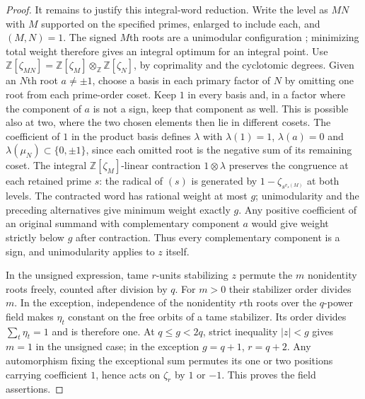 \documentclass[11pt,a4paper]{article}
\numberwithin{equation}{section}
\theoremstyle{remark}
\begin{document}
\begin{proof}
It remains to justify this integral-word reduction. Write the level as $MN$ with $M$ supported on the specified primes, enlarged to include each, and $(M,N)=1$. The signed $M$th roots are a unimodular configuration \cite[Theorems~3, 13]{BH}; minimizing total weight therefore gives an integral optimum for an integral point. Use $\mathbb Z[\zeta_{MN}]=\mathbb Z[\zeta_M]\otimes_{\mathbb Z}\mathbb Z[\zeta_N]$, by coprimality and the cyclotomic degrees. Given an $N$th root $a\ne\pm1$, choose a basis in each primary factor of $N$ by omitting one root from each prime-order coset. Keep $1$ in every basis and, in a factor where the component of $a$ is not a sign, keep that component as well. This is possible also at two, where the two chosen elements then lie in different cosets. The coefficient of $1$ in the product basis defines $\lambda$ with $\lambda(1)=1$, $\lambda(a)=0$ and $\lambda(\mu_N)\subset\{0,\pm1\}$, since each omitted root is the negative sum of its remaining coset. The integral $\mathbb Z[\zeta_M]$-linear contraction $1\otimes\lambda$ preserves the congruence at each retained prime $s$: the radical of $(s)$ is generated by $1-\zeta_{s^{v_s(M)}}$ at both levels. The contracted word has rational weight at most $g$; unimodularity and the preceding alternatives give minimum weight exactly $g$. Any positive coefficient of an original summand with complementary component $a$ would give weight strictly below $g$ after contraction. Thus every complementary component is a sign, and unimodularity applies to $z$ itself.

In the unsigned expression, tame $r$-units stabilizing $z$ permute the $m$ nonidentity roots freely, counted after division by $q$. For $m>0$ their stabilizer order divides $m$. In the exception, independence of the nonidentity $r$th roots over the $q$-power field makes $\eta_t$ constant on the free orbits of a tame stabilizer. Its order divides $\sum_t\eta_t=1$ and is therefore one. At $q\le g<2q$, strict inequality $|z|<g$ gives $m=1$ in the unsigned case; in the exception $g=q+1$, $r=q+2$. Any automorphism fixing the exceptional sum permutes its one or two positions carrying coefficient $1$, hence acts on $\zeta_r$ by $1$ or $-1$. This proves the field assertions.
\end{proof}
\end{document}

